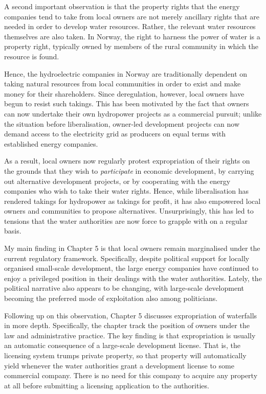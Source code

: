 A second important observation is that the property rights that the energy companies tend to take from local owners are not merely ancillary rights that are needed in order to develop water resources. Rather, the relevant water resources themselves are also taken. In Norway, the right to harness the power of water is a property right, typically owned by members of the rural community in which the resource is found.

Hence, the hydroelectric companies in Norway are traditionally dependent on taking natural resources from local communities in order to exist and make money for their shareholders. Since deregulation, however, local owners have begun to resist such takings. This has been motivated by the fact that owners can now undertake their own hydropower projects as a commercial pursuit; unlike the situation before liberalisation, owner-led development projects can now demand access to the electricity grid as producers on equal terms with established energy companies.

As a result, local owners now regularly protest expropriation of their rights on the grounds that they wish to {\it participate} in economic development, by carrying out alternative development projects, or by cooperating with the energy companies who wish to take their water rights. Hence, while liberalisation has rendered takings for hydropower as takings for profit, it has also empowered local owners and communities to propose alternatives. Unsurprisingly, this has led to tensions that the water authorities are now force to grapple with on a regular basis.

My main finding in Chapter 5 is that local owners remain marginalised under the current regulatory framework. Specifically, despite political support for locally organised small-scale development, the large energy companies have continued to enjoy a privileged position in their dealings with the water authorities. Lately, the political narrative also appears to be changing, with large-scale development becoming the preferred mode of exploitation also among politicians.

Following up on this observation, Chapter 5 discusses expropriation of waterfalls in more depth. Specifically, the chapter track the position of owners under the law and administrative practice. The key finding is that expropriation is usually an automatic consequence of a large-scale development license. That is, the licensing system trumps private property, so that property will automatically yield whenever the water authorities grant a development license to some commercial company. There is no need for this company to acquire any property at all before submitting a licensing application to the authorities.

